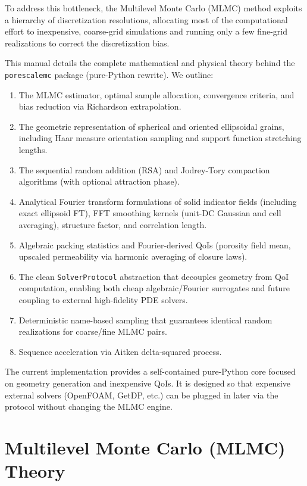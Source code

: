 \documentclass[preprint,12pt]{elsarticle}
\begin{document}
To address this bottleneck, the Multilevel Monte Carlo (MLMC) method \citep{giles2008multilevel, cliffe2011multilevel} exploits a hierarchy of discretization resolutions, allocating most of the computational effort to inexpensive, coarse-grid simulations and running only a few fine-grid realizations to correct the discretization bias. 

This manual details the complete mathematical and physical theory behind the \texttt{porescalemc} package (pure-Python rewrite). We outline:
\begin{enumerate}
    \item The MLMC estimator, optimal sample allocation, convergence criteria, and bias reduction via Richardson extrapolation.
    \item The geometric representation of spherical and oriented ellipsoidal grains, including Haar measure orientation sampling and support function stretching lengths.
    \item The sequential random addition (RSA) and Jodrey-Tory compaction algorithms (with optional attraction phase).
    \item Analytical Fourier transform formulations of solid indicator fields (including exact ellipsoid FT), FFT smoothing kernels (unit-DC Gaussian and cell averaging), structure factor, and correlation length.
    \item Algebraic packing statistics and Fourier-derived QoIs (porosity field mean, upscaled permeability via harmonic averaging of closure laws).
    \item The clean \texttt{SolverProtocol} abstraction that decouples geometry from QoI computation, enabling both cheap algebraic/Fourier surrogates and future coupling to external high-fidelity PDE solvers.
    \item Deterministic name-based sampling that guarantees identical random realizations for coarse/fine MLMC pairs.
    \item Sequence acceleration via Aitken delta-squared process.
\end{enumerate}

The current implementation provides a self-contained pure-Python core focused on geometry generation and inexpensive QoIs. It is designed so that expensive external solvers (OpenFOAM, GetDP, etc.) can be plugged in later via the protocol without changing the MLMC engine.

\section{Multilevel Monte Carlo (MLMC) Theory}
\label{sec:mlmc}
\end{document}
